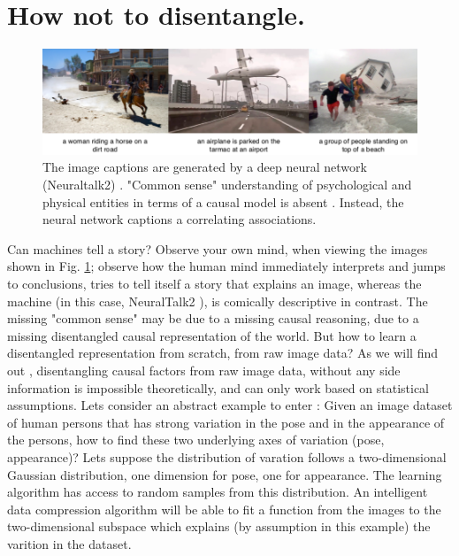 \section{How not to disentangle.}
	\begin{figure}[t]
		\centering
		\includegraphics[trim={0cm 0cm 0cm 0cm},clip, width=1.\linewidth]{fig/notcausal}
		\caption{The image captions are generated by a deep neural network (Neuraltalk2) \cite{karpathy15neuraltalk}. "Common sense" understanding of psychological and physical entities in terms of a causal model is absent \cite{Tenenbaum:2018wm}. Instead, the neural network captions a correlating associations.}
		\label{fig:notcausal}
	\end{figure}
	Can machines tell a story? Observe your own mind, when viewing the images shown in Fig. \ref{fig:notcausal}; observe how the human mind immediately interprets and jumps to conclusions, tries to tell itself a story that explains an image, whereas the machine (in this case, NeuralTalk2 \cite{karpathy15neuraltalk}), is comically descriptive in contrast. 
	The missing "common sense" may be due to a missing causal reasoning, due to a missing disentangled causal representation of the world.
	But how to learn a disentangled representation from scratch, \ie from raw image data?
	As we will find out , disentangling causal factors from raw image data, without any side information is impossible theoretically, and can only work based on statistical assumptions. 
	Lets consider an abstract example to enter :
	Given an image dataset of human persons that has strong variation in the pose and in the appearance of the persons, how to find these two underlying axes of variation (pose, appearance)? Lets suppose the distribution of varation follows a two-dimensional Gaussian distribution, one dimension for pose, one for appearance. The learning algorithm has access to random samples from this distribution. An intelligent data compression algorithm will be able to fit a function from the images to the two-dimensional subspace which explains (by assumption in this example) the varition in the dataset.
